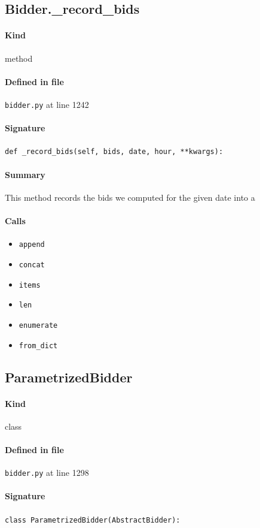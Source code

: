 \documentclass[11pt]{report}
\begin{document}
\subsection{Bidder.\_record\_bids}
\label{def:bidder.py:Bidder._record_bids:L1242}
\paragraph{Kind} method
\paragraph{Defined in file} \texttt{bidder.py} at line 1242
\paragraph{Signature} \texttt{def \_record\_bids(self, bids, date, hour, **kwargs):}
\paragraph{Summary} This method records the bids we computed for the given date into a
\paragraph{Calls}
\begin{itemize}[leftmargin=*]
  \item \texttt{append}
  \item \texttt{concat}
  \item \texttt{items}
  \item \texttt{len}
  \item \texttt{enumerate}
  \item \texttt{from\_dict}
\end{itemize}
\subsection{ParametrizedBidder}
\label{def:bidder.py:ParametrizedBidder:L1298}
\paragraph{Kind} class
\paragraph{Defined in file} \texttt{bidder.py} at line 1298
\paragraph{Signature} \texttt{class ParametrizedBidder(AbstractBidder):}
\end{document}
